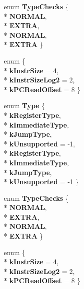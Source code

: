 \begin{DoxyCompactItemize}
\item 
enum {\bfseries Type\+Checks} \{ \\*
{\bfseries N\+O\+R\+M\+AL}, 
\\*
{\bfseries E\+X\+T\+RA}, 
\\*
{\bfseries N\+O\+R\+M\+AL}, 
\\*
{\bfseries E\+X\+T\+RA}
 \}\hypertarget{classv8_1_1internal_1_1_instruction_adc68a0724199f5c35a1540f9190dd359}{}\label{classv8_1_1internal_1_1_instruction_adc68a0724199f5c35a1540f9190dd359}

\item 
enum \{ \\*
{\bfseries k\+Instr\+Size} = 4, 
\\*
{\bfseries k\+Instr\+Size\+Log2} = 2, 
\\*
{\bfseries k\+P\+C\+Read\+Offset} = 8
 \}\hypertarget{classv8_1_1internal_1_1_instruction_a62aede7572856910eaa72e6e12d06d5e}{}\label{classv8_1_1internal_1_1_instruction_a62aede7572856910eaa72e6e12d06d5e}

\item 
enum {\bfseries Type} \{ \\*
{\bfseries k\+Register\+Type}, 
\\*
{\bfseries k\+Immediate\+Type}, 
\\*
{\bfseries k\+Jump\+Type}, 
\\*
{\bfseries k\+Unsupported} = -\/1, 
\\*
{\bfseries k\+Register\+Type}, 
\\*
{\bfseries k\+Immediate\+Type}, 
\\*
{\bfseries k\+Jump\+Type}, 
\\*
{\bfseries k\+Unsupported} = -\/1
 \}\hypertarget{classv8_1_1internal_1_1_instruction_a4599db43cd142c37237809a72f46d840}{}\label{classv8_1_1internal_1_1_instruction_a4599db43cd142c37237809a72f46d840}

\item 
enum {\bfseries Type\+Checks} \{ \\*
{\bfseries N\+O\+R\+M\+AL}, 
\\*
{\bfseries E\+X\+T\+RA}, 
\\*
{\bfseries N\+O\+R\+M\+AL}, 
\\*
{\bfseries E\+X\+T\+RA}
 \}\hypertarget{classv8_1_1internal_1_1_instruction_adc68a0724199f5c35a1540f9190dd359}{}\label{classv8_1_1internal_1_1_instruction_adc68a0724199f5c35a1540f9190dd359}

\item 
enum \{ \\*
{\bfseries k\+Instr\+Size} = 4, 
\\*
{\bfseries k\+Instr\+Size\+Log2} = 2, 
\\*
{\bfseries k\+P\+C\+Read\+Offset} = 8
 \}\hypertarget{classv8_1_1internal_1_1_instruction_a5126858fe215f59b7d534901acb77291}{}\label{classv8_1_1internal_1_1_instruction_a5126858fe215f59b7d534901acb77291}


\end{DoxyCompactItemize}
